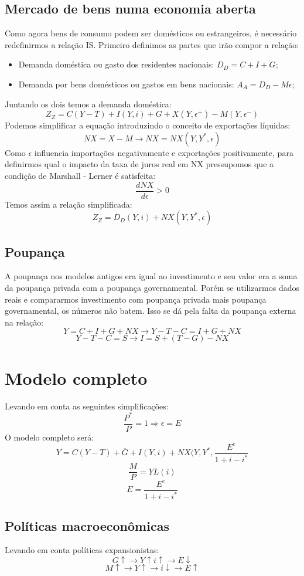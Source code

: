 \documentclass[12pt,a4paper,oneside,brazil]{abntex2}
\begin{document}
\subsection{Mercado de bens numa economia aberta}
Como agora bens de consumo podem ser domésticos ou estrangeiros, é necessário redefinirmos a relação IS. Primeiro definimos as partes que irão compor a relação:
\begin{itemize}
\item Demanda doméstica ou gasto dos residentes nacionais: $D_D = C + I + G$;
\item Demanda por bens domésticos ou gastos em bens nacionais: $A_A = D_D - M \epsilon$;
\end{itemize}
Juntando os dois temos a demanda doméstica:
\[ Z_Z = C (Y - T) + I ( Y, i) + G + X (Y, \epsilon^+) - M (Y, \epsilon^-) \]
Podemos simplificar a equação introduzindo o conceito de exportações líquidas:
\[ NX = X - M \rightarrow NX = NX(Y, Y^{*}, \epsilon) \]
Como $\epsilon$ influencia importações negativamente e exportações positivamente, para definirmos qual o impacto da taxa de juros real em NX pressupomos que a condição de Marshall - Lerner é satisfeita:
\[ \frac{d NX}{d \epsilon} > 0\]
Temos assim a relação simplificada:
\[ Z_Z = D_D ( Y, i ) + NX (Y, Y^{*}, \epsilon) \]

\subsection{Poupança}
A poupança nos modelos antigos era igual ao investimento e seu valor era a soma da poupança privada com a poupança governamental. Porém se utilizarmos dados reais e compararmos investimento com poupança privada mais poupança governamental, os números não batem. Isso se dá pela falta da poupança externa na relação:
\[ Y  = C + I + G + NX \rightarrow Y - T - C  = I + G + NX\]
\[ Y - T -C = S \rightarrow I = S + (T -G) - NX \]

\section{Modelo completo}
Levando em conta as seguintes simplificações:
\[ \frac{P^{*}}{P} = 1 \Rightarrow  \epsilon = E\]
O modelo completo será:
\begin{equation}\label{IS}
Y = C (Y - T) + \overline{G} + I  (Y, i ) + NX ( Y, Y^{*}, \frac{E^e}{1 + i - i^{*}}
\end{equation}
\begin{equation}\label{LM}
\frac{M}{P} = Y L (i)
\end{equation}
\begin{equation}\label{E}
E = \frac{E^e}{1 + i - i^{*}}
\end{equation}

\subsection{Políticas macroeconômicas}
Levando em conta políticas expansionistas:
\[ G \uparrow  \rightarrow Y \uparrow i \uparrow \rightarrow E\downarrow\]
\[ M \uparrow \rightarrow Y \uparrow \rightarrow i \downarrow \rightarrow E \uparrow\]

\printbibliography
\end{document}
